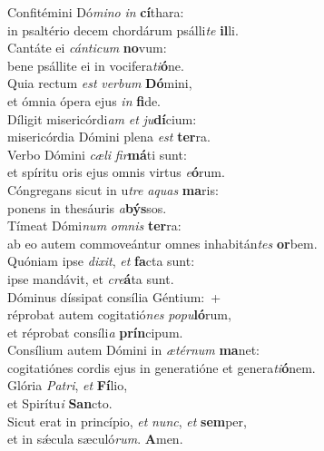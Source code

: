 \evenverse Confitémini Dó\textit{mi}\textit{no} \textit{in} \textbf{cí}thara:~\*\\
\evenverse in psaltério decem chordárum psálli\textit{te} \textbf{il}li.\\
\oddverse Cantáte ei \textit{cán}\textit{ti}\textit{cum} \textbf{no}vum:~\*\\
\oddverse bene psállite ei in vocifera\textit{ti}\textbf{ó}ne.\\
\evenverse Quia rectum \textit{est} \textit{ver}\textit{bum} \textbf{Dó}mini,~\*\\
\evenverse et ómnia ópera ejus \textit{in} \textbf{fi}de.\\
\oddverse Díligit misericórdi\textit{am} \textit{et} \textit{ju}\textbf{dí}cium:~\*\\
\oddverse misericórdia Dómini plena \textit{est} \textbf{ter}ra.\\
\evenverse Verbo Dómini \textit{cæ}\textit{li} \textit{fir}\textbf{má}ti sunt:~\*\\
\evenverse et spíritu oris ejus omnis virtus \textit{e}\textbf{ó}rum.\\
\oddverse Cóngregans sicut in u\textit{tre} \textit{a}\textit{quas} \textbf{ma}ris:~\*\\
\oddverse ponens in thesáuris \textit{a}\textbf{býs}sos.\\
\evenverse Tímeat Dómi\textit{num} \textit{om}\textit{nis} \textbf{ter}ra:~\*\\
\evenverse ab eo autem commoveántur omnes inhabitán\textit{tes} \textbf{or}bem.\\
\oddverse Quóniam ipse \textit{di}\textit{xit}, \textit{et} \textbf{fa}cta sunt:~\*\\
\oddverse ipse mandávit, et \textit{cre}\textbf{á}ta sunt.\\
\evenverse Dóminus díssipat consília Géntium:~+\\
\evenverse  réprobat autem cogitatió\textit{nes} \textit{po}\textit{pu}\textbf{ló}rum,~\*\\
\evenverse et réprobat consíli\textit{a} \textbf{prín}cipum.\\
\oddverse Consílium autem Dómini in \textit{æ}\textit{tér}\textit{num} \textbf{ma}net:~\*\\
\oddverse cogitatiónes cordis ejus in generatióne et genera\textit{ti}\textbf{ó}nem.\\
\evenverse Glória \textit{Pa}\textit{tri}, \textit{et} \textbf{Fí}lio,~\*\\
\evenverse et Spirítu\textit{i} \textbf{San}cto.\\
\oddverse Sicut erat in princípio, \textit{et} \textit{nunc}, \textit{et} \textbf{sem}per,~\*\\
\oddverse et in sǽcula sæculó\textit{rum}. \textbf{A}men.\\
